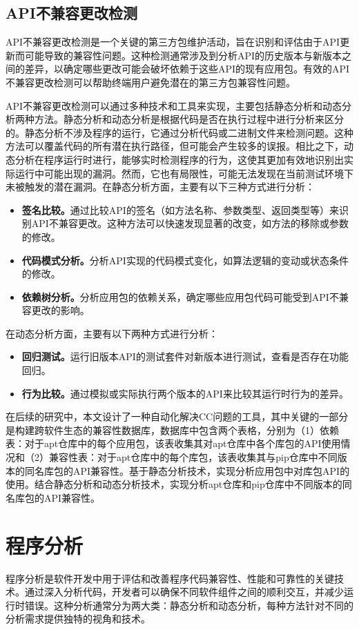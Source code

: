 \subsection{API不兼容更改检测}
API不兼容更改检测是一个关键的第三方包维护活动，旨在识别和评估由于API更新而可能导致的兼容性问题。这种检测通常涉及到分析API的历史版本与新版本之间的差异，以确定哪些更改可能会破坏依赖于这些API的现有应用包。有效的API不兼容更改检测可以帮助终端用户避免潜在的第三方包兼容性问题。

API不兼容更改检测可以通过多种技术和工具来实现，主要包括静态分析和动态分析两种方法。静态分析和动态分析是根据代码是否在执行过程中进行分析来区分的。静态分析不涉及程序的运行，它通过分析代码或二进制文件来检测问题。这种方法可以覆盖代码的所有潜在执行路径，但可能会产生较多的误报。相比之下，动态分析在程序运行时进行，能够实时检测程序的行为，这使其更加有效地识别出实际运行中可能出现的漏洞。然而，它也有局限性，可能无法发现在当前测试环境下未被触发的潜在漏洞。在静态分析方面，主要有以下三种方式进行分析：
\begin{itemize}
	\item \textbf{签名比较。}通过比较API的签名（如方法名称、参数类型、返回类型等）来识别API不兼容更改。这种方法可以快速发现显著的改变，如方法的移除或参数的修改。
	\item \textbf{代码模式分析。}分析API实现的代码模式变化，如算法逻辑的变动或状态条件的修改。
	\item \textbf{依赖树分析。}分析应用包的依赖关系，确定哪些应用包代码可能受到API不兼容更改的影响。
\end{itemize}
在动态分析方面，主要有以下两种方式进行分析：
\begin{itemize}
	\item \textbf{回归测试。}运行旧版本API的测试套件对新版本进行测试，查看是否存在功能回归。
	\item \textbf{行为比较。}通过模拟或实际执行两个版本的API来比较其运行时行为的差异。
\end{itemize}

在后续的研究中，本文设计了一种自动化解决CC问题的工具\tool{}，其中关键的一部分是构建跨软件生态的兼容性数据库，数据库中包含两个表格，分别为（1）依赖表：对于apt仓库中的每个应用包，该表收集其对apt仓库中各个库包的API使用情况和（2）兼容性表：对于apt仓库中的每个库包，该表收集其与pip仓库中不同版本的同名库包的API兼容性。\tool{}基于静态分析技术，实现分析应用包中对库包API的使用。\tool{}结合静态分析和动态分析技术，实现分析apt仓库和pip仓库中不同版本的同名库包的API兼容性。

\section{程序分析}
程序分析是软件开发中用于评估和改善程序代码兼容性、性能和可靠性的关键技术。通过深入分析代码，开发者可以确保不同软件组件之间的顺利交互，并减少运行时错误。这种分析通常分为两大类：静态分析和动态分析，每种方法针对不同的分析需求提供独特的视角和技术。

